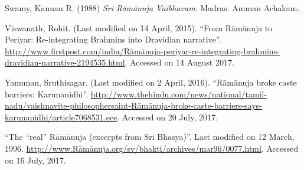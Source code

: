 \begin{thebibliography}{99}
  Swamy, Kannan R. (1988) \textit{Sri Rāmānuja Vaibhavam}. Madras. Amman Achakam.

  Viswanath, Rohit. (Last modified on 14 April, 2015). “From Rāmānuja to Periyar: Re-integrating Brahmins into Dravidian narrative”. \url{http://www.firstpost.com/india/Rāmānuja-periyar-re-integrating-brahmins-dravidian-narrative-2194535.html}. Accessed on 14 August 2017.

  Yamunan, Sruthisagar. (Last modified on 2 April, 2016). “Rāmānuja broke caste barriers: Karunanidhi”. \url{http://www.thehindu.com/news/national/tamil-nadu/vaishnavite-philosophersaint-Rāmānuja-broke-caste-barriers-says-karunanidhi/article7068531.ece}. Accessed on 20 July, 2017.

  “The “real” Rāmānuja (excerpts from Sri Bhasya)”. Last modified on 12 March, 1996. \url{http://www.Rāmānuja.org/sv/bhakti/archives/mar96/0077.html}. Accessed on 16 July, 2017.

 \end{thebibliography}

